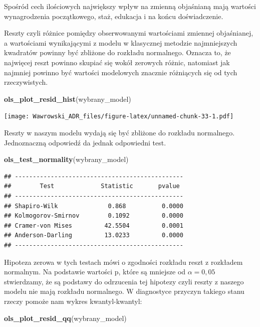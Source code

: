 \documentclass[]{book}
\newenvironment{Shaded}{\begin{snugshade}}{\end{snugshade}}
\newcommand{\KeywordTok}[1]{\textcolor[rgb]{0.13,0.29,0.53}{\textbf{#1}}}
\newcommand{\NormalTok}[1]{#1}
\begin{document}
Spośród cech ilościowych największy wpływ na zmienną objaśnianą mają wartości wynagrodzenia początkowego, staż, edukacja i na końcu doświadczenie.

Reszty czyli różnice pomiędzy obserwowanymi wartościami zmiennej objaśnianej, a wartościami wynikającymi z modelu w klasycznej metodzie najmniejszych kwadratów powinny być zbliżone do rozkładu normalnego. Oznacza to, że najwięcej reszt powinno skupiać się wokół zerowych różnic, natomiast jak najmniej powinno być wartości modelowych znacznie różniących się od tych rzeczywistych.

\begin{Shaded}
\begin{Highlighting}[]
\KeywordTok{ols_plot_resid_hist}\NormalTok{(wybrany_model)}
\end{Highlighting}
\end{Shaded}

\texttt{[image: Wawrowski\_ADR\_files/figure-latex/unnamed-chunk-33-1.pdf]}

Reszty w naszym modelu wydają się być zbliżone do rozkładu normalnego. Jednoznaczną odpowiedź da jednak odpowiedni test.

\begin{Shaded}
\begin{Highlighting}[]
\KeywordTok{ols_test_normality}\NormalTok{(wybrany_model)}
\end{Highlighting}
\end{Shaded}

\begin{verbatim}
## -----------------------------------------------
##        Test             Statistic       pvalue  
## -----------------------------------------------
## Shapiro-Wilk              0.868          0.0000 
## Kolmogorov-Smirnov        0.1092         0.0000 
## Cramer-von Mises         42.5504         0.0001 
## Anderson-Darling         13.0233         0.0000 
## -----------------------------------------------
\end{verbatim}

Hipoteza zerowa w tych testach mówi o zgodności rozkładu reszt z rozkładem normalnym. Na podstawie wartości p, które są mniejsze od \(\alpha=0,05\) stwierdzamy, że są podstawy do odrzucenia tej hipotezy czyli reszty z naszego modelu nie mają rozkładu normalnego. W diagnostyce przyczyn takiego stanu rzeczy pomoże nam wykres kwantyl-kwantyl:

\begin{Shaded}
\begin{Highlighting}[]
\KeywordTok{ols_plot_resid_qq}\NormalTok{(wybrany_model)}
\end{Highlighting}
\end{Shaded}
\end{document}
